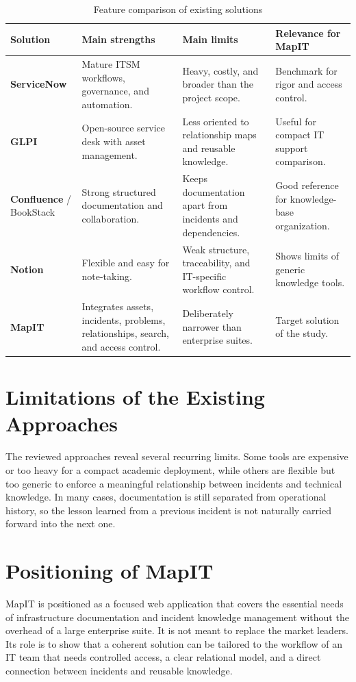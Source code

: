 \begin{table}[H]
\centering
\small
\setlength{\tabcolsep}{3pt}
\renewcommand{\arraystretch}{1.12}
\begin{tabular}{|>{\raggedright\arraybackslash}p{2.35cm}|>{\raggedright\arraybackslash}p{3.85cm}|>{\raggedright\arraybackslash}p{3.85cm}|>{\raggedright\arraybackslash}p{3.85cm}|}
\hline
\textbf{Solution} & \textbf{Main strengths} & \textbf{Main limits} & \textbf{Relevance for MapIT} \\ \hline
\textbf{ServiceNow} & Mature ITSM workflows, governance, and automation. & Heavy, costly, and broader than the project scope. & Benchmark for rigor and access control. \\ \hline
\textbf{GLPI} & Open-source service desk with asset management. & Less oriented to relationship maps and reusable knowledge. & Useful for compact IT support comparison. \\ \hline
\textbf{Confluence} / BookStack & Strong structured documentation and collaboration. & Keeps documentation apart from incidents and dependencies. & Good reference for knowledge-base organization. \\ \hline
\textbf{Notion} & Flexible and easy for note-taking. & Weak structure, traceability, and IT-specific workflow control. & Shows limits of generic knowledge tools. \\ \hline
\textbf{MapIT} & Integrates assets, incidents, problems, relationships, search, and access control. & Deliberately narrower than enterprise suites. & Target solution of the study. \\ \hline
\end{tabular}
\caption{Feature comparison of existing solutions}
\label{tab:feature-comparison}
\end{table}

\section{Limitations of the Existing Approaches}
The reviewed approaches reveal several recurring limits. Some tools are expensive or too heavy for a compact academic deployment, while others are flexible but too generic to enforce a meaningful relationship between incidents and technical knowledge. In many cases, documentation is still separated from operational history, so the lesson learned from a previous incident is not naturally carried forward into the next one.

\section{Positioning of MapIT}
MapIT is positioned as a focused web application that covers the essential needs of infrastructure documentation and incident knowledge management without the overhead of a large enterprise suite. It is not meant to replace the market leaders. Its role is to show that a coherent solution can be tailored to the workflow of an IT team that needs controlled access, a clear relational model, and a direct connection between incidents and reusable knowledge.


